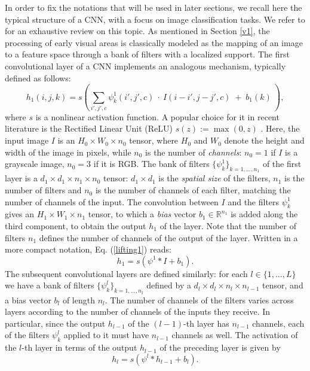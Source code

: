 \documentclass[11pt,oneside,reqno]{amsart}
\begin{document}
 In order to fix the notations that will be used in later sections, we recall here the typical structure of a CNN, with a focus on image classification tasks. We refer to \citet{rawatwang} for an exhaustive review on this topic. As mentioned in Section \ref{v1}, the processing of early visual areas is classically modeled as the mapping of an image to a feature space through a bank of filters with a localized support. The first convolutional layer of a CNN implements an analogous mechanism, typically  defined as follows:
 \begin{equation}\label{lifting1}
  h_1(i,j,k) = s\left( \sum_{i',j',c} \psi^1_k(i',j',c)\:\cdot\:I(i-i',j-j',c)\; +\; b_1(k) \:\right),
 \end{equation}
 where $s$ is a nonlinear activation function. A popular choice for it in recent literature is the Rectified Linear Unit (ReLU) $s(z) := \max(0,z)$ \citep{relu,krizhevsky}. Here, the input image $I$ is an $H_0\times W_0\times n_0$ tensor, where $H_0$ and $W_0$ denote the height and width of the image in pixels, while $n_0$ is the number of \emph{channels}: $n_0=1$ if $I$ is a grayscale image, $n_0=3$ if it is RGB. The bank of filters $\{\psi^1_k\}_{k=1,\ldots, n_1}$ of the first layer is a $d_1 \times d_1 \times n_1 \times n_0$ tensor: $d_1 \times d_1$ is the \emph{spatial size} of the filters, $n_1$ is the number of filters and $n_0$ is the number of channels of each filter, matching the number of channels of the input. The convolution between $I$ and the filters $\psi^1_k$ gives an $H_1\times W_1 \times n_1$ tensor, to which a \emph{bias} vector $b_1 \in \mathbb{R}^{n_1}$ is added along the third component, to obtain the output $h_1$ of the layer. Note that the number of filters $n_1$ defines the number of channels of the output of the layer. Written in a more compact notation, Eq. (\ref{lifting1}) reads:
 \[h_1 = s(\psi^1 \ast I + b_1).\]
 The subsequent convolutional layers are defined similarly: for each $l \in \{1,\ldots,L\}$ we have a bank of filters $\{\psi^l_k\}_{k=1,\ldots, n_l}$ defined by a $d_l \times d_l \times n_l \times n_{l-1}$ tensor, and a bias vector $b_l$ of length $n_l$. The number of channels of the filters varies across layers according to the number of channels of the inputs they receive. In particular, since the output $h_{l-1}$ of the $(l-1)$-th layer has $n_{l-1}$ channels, each of the filters $\psi^l_k$ applied to it must have $n_{l-1}$ channels as well. The activation of the $l$-th layer in terms of the output $h_{l-1}$ of the preceding layer is given by
 \[h_l = s(\psi^l \ast h_{l-1} + b_l).\]
\end{document}

